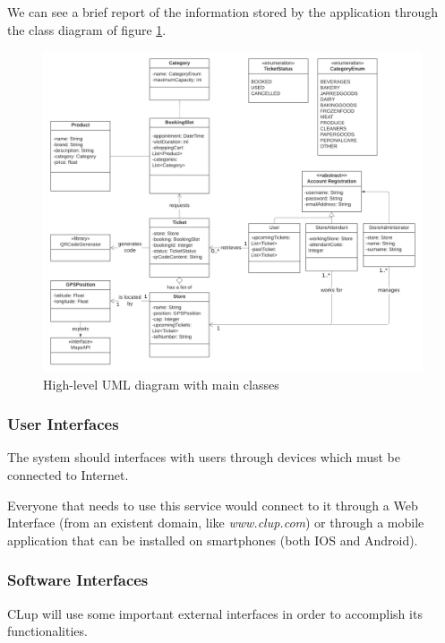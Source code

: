\documentclass[table, 12pt]{article}
\begin{document}
We can see a brief report of the information stored by the application through the class diagram of figure \ref{class_diagram}.

\begin{figure}
    \begin{center}
        \hspace*{-1.5in}
        \includegraphics[width=\paperwidth]{assets/UML.png}
        \caption{High-level UML diagram with main classes}
        \label{class_diagram}
    \end{center}

\end{figure}

\subsubsection{User Interfaces}
The system should interfaces with users through devices which must be connected to Internet.

Everyone that needs to use this service would connect to it through a Web Interface (from an existent domain, like \textit{www.clup.com}) or through a mobile application that can be installed on smartphones (both IOS and Android).

\subsubsection{Software Interfaces}
CLup will use some important external interfaces in order to accomplish its functionalities.
\end{document}
